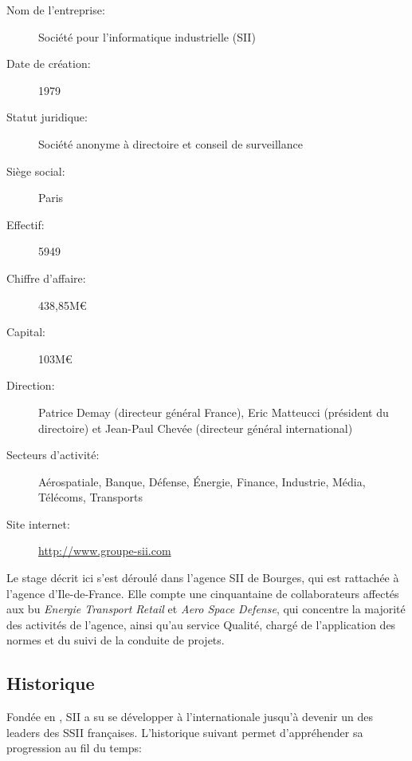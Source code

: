 {{{{				\begin{description}
					\item[Nom de l'entreprise:] Société pour l'informatique industrielle (SII)
					\item[Date de création:] 1979\cite{sii_rf}
					\item[Statut juridique:] Société anonyme à directoire et conseil de surveillance
					\item[Siège social:] Paris
					\item[Effectif:] 5949\cite{sii_rs_2017}
					\item[Chiffre d'affaire:] 438,85M\euro\cite{sii_rs_2017}
					\item[Capital:] 103M\euro\cite{sii_rf}
					\item[Direction:] Patrice Demay (directeur général France), Eric Matteucci (président du directoire) et Jean-Paul Chevée (directeur général international)
					\item[Secteurs d'activité:] Aérospatiale, Banque, Défense, Énergie, Finance, Industrie, Média, Télécoms, Transports
					\item[Site internet:] \url{http://www.groupe-sii.com}
				\end{description}
			}
			
			\par
			{
				Le stage décrit ici s'est déroulé dans l'agence SII de Bourges, qui est rattachée à l'agence d'Ile-de-France. Elle compte une cinquantaine de collaborateurs affectés aux \gls{bu} \emph{Energie Transport Retail} et \emph{Aero Space Defense}, qui concentre la majorité des activités de l'agence, ainsi qu'au service Qualité, chargé de l'application des normes et du suivi de la conduite de projets.
			}
			
		}
		\subsection{Historique}
			
			\par
			{
				Fondée en , SII a su se développer à l'internationale jusqu'à devenir un des leaders des SSII françaises. L'historique suivant permet d'appréhender sa progression au fil du temps:
			}
			
}}
